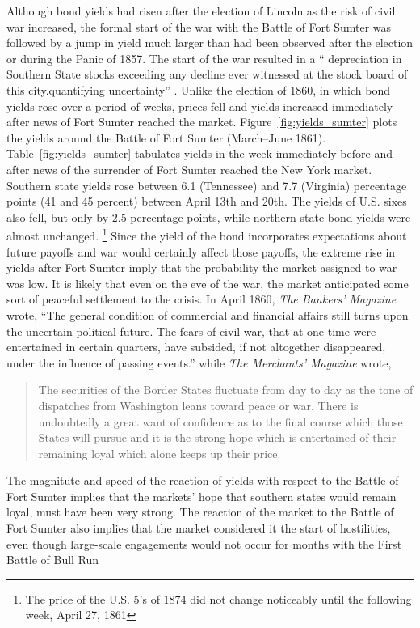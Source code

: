 \documentclass[11pt, oneside, article]{memoir}\usepackage[]{graphicx}\usepackage[]{color}
\begin{document}
Although bond yields had risen after the election of Lincoln as the risk of civil war increased, the formal start of the war with the Battle of Fort Sumter was followed by a jump in yield much larger than had been observed after the election or during the Panic of 1857.
The start of the war resulted in a `` depreciation in Southern State stocks exceeding any decline ever witnessed at the stock board of this city.quantifying uncertainty'' \parencite[919]{BankersMagazine1861}.
Unlike the election of 1860, in which bond yields rose over a period of weeks, prices fell and yields increased immediately after news of Fort Sumter reached the market.
Figure~\ref{fig:yields_sumter} plots the yields around the Battle of Fort Sumter (March--June 1861).
Table~\ref{fig:yields_sumter} tabulates yields in the week immediately before and after news of the surrender of Fort Sumter reached the New York market.
Southern state yields rose between 6.1 (Tennessee) and 7.7 (Virginia) percentage points (41 and 45 percent) between April 13th and 20th.
The yields of U.S. sixes also fell, but only by 2.5 percentage points,
while northern state bond yields were almost unchanged.%
\footnote{The price of the U.S. 5's of 1874 did not change noticeably until the following week, April 27, 1861}
Since the yield of the bond incorporates expectations about future payoffs and war would certainly affect those payoffs, the extreme rise in yields after Fort Sumter imply that the probability the market assigned to war was low.
It is likely that even on the eve of the war, the market anticipated some sort of peaceful settlement to the crisis.
In April 1860, \textit{The Bankers' Magazine} wrote, ``The general condition of commercial and financial affairs still turns upon the uncertain political future. The fears of civil war, that at one time were entertained in certain quarters, have subsided, if not altogether disappeared, under the influence of passing events.'' \parencite[413]{HomansDana1861a}
while \textit{The Merchants' Magazine} wrote,
\begin{quotation}
  The securities of the Border States fluctuate from day to day as the tone of dispatches from Washington leans toward peace or war.
  There is undoubtedly a great want of confidence as to the final course which those States will pursue and it is the strong hope which is entertained of their remaining loyal which alone keeps up their price. \parencite[838]{BankersMagazine1861}
\end{quotation}
The magnitute and speed of the reaction of yields with respect to the Battle of Fort Sumter implies that the markets' hope that southern states would remain loyal, must have been very strong.
The reaction of the market to the Battle of Fort Sumter also implies that the market considered it the start of hostilities, even though large-scale engagements would not occur for months with the First Battle of Bull Run
\end{document}
